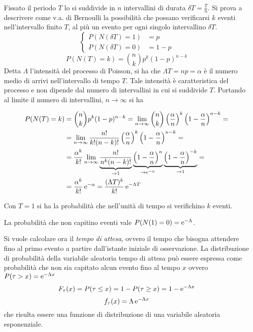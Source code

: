 Fissato il periodo $T$ lo si suddivide in $n$ intervallini di durata $\delta T=\frac{T}{n}$. Si prova a descrivere come v.a. di Bernoulli la possibilità che possano verificarsi $k$ eventi nell'intervallo finito $T$, al più un evento per ogni singolo intervallino $\delta T$.
\begin{equation}
\begin{cases}
	P(N(\delta T)=1)&=p\\
	P(N(\delta T)=0)&=1-p
\end{cases}
\end{equation}
\begin{equation}
	P(N(T)=k)=\binom{n}{k}p^k(1-p)^{n-k}
\end{equation}
Detta $\Lambda$ l'intensità del processo di Poisson, si ha che $\Lambda T=n p=\alpha$ è il numero medio di arrivi nell'intervallo di tempo $T$. Tale intensità è caratteristica del processo e non dipende dal numero di intervallini in cui si suddivide $T$. Portando al limite il numero di intervallini, $n\to\infty$ si ha

\begin{equation}
\begin{split}
	P(N(T)=k)&=\binom{n}{k}p^k(1-p)^{n-k}=\lim\limits_{n\to\infty}\binom{n}{k}\left(\frac{\alpha}{n}\right)^k\left(1-\frac{\alpha}{n}\right)^{n-k}=\\
	&=\lim\limits_{n\to\infty}\frac{n!}{k!(n-k)!}\left(\frac{\alpha}{n}\right)^k\left(1-\frac{\alpha}{n}\right)^{n-k}=\\
	&=\frac{\alpha^k}{k!}\lim\limits_{n\to\infty}\underbrace{\frac{n!}{n^k(n-k)!}}_{\to 1}\underbrace{\left(1-\frac{\alpha}{n}\right)^n}_{\to\operatorname{e}^{-\alpha}} \underbrace{\left(1-\frac{\alpha}{n}\right)^{-k}}_{\to 1}=\\
	&=\frac{\alpha^k}{k!}\operatorname{e}^{-\alpha}=\frac{(\Lambda T)^k}{k!}\operatorname{e}^{-\Lambda T}
	\end{split}
\end{equation}

Con $T=1$ si ha la probabilità che nell'unità di tempo si verifichino $k$ eventi.

La probabilità che non capitino eventi vale $P(N(1)=0)=\operatorname{e}^{-\Lambda}$.

Si vuole calcolare ora il \emph{tempo di attesa}, ovvero il tempo che bisogna attendere fino al primo evento a partire dall'istante iniziale di osservazione. La distribuzione di probabilità della variabile aleatoria tempo di attesa può essere espressa come probabilità che non sia capitato alcun evento fino al tempo $x$ ovvero $P(\tau>x)=\operatorname{e}^{-\Lambda x}$
\begin{equation}
	F_\tau(x)=P(\tau\leq x)=1-P(\tau\geq x)=1-\operatorname{e}^{-\Lambda x}
\end{equation}
\begin{equation}
	f_\tau(x)=\Lambda\operatorname{e}^{-\Lambda x}
\end{equation}
che risulta essere una funzione di distribuzione di una variabile aleatoria esponenziale.

